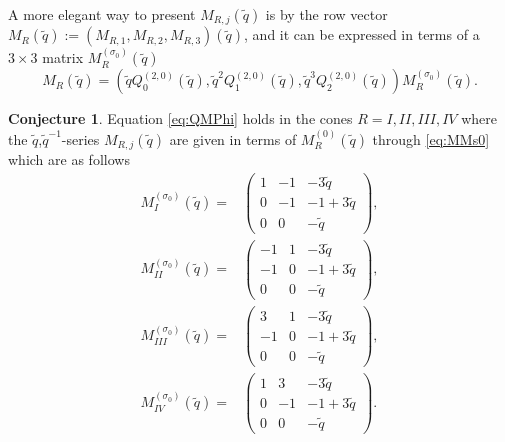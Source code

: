 \documentclass[12pt,reqno]{amsart}
\theoremstyle{definition}
\newtheorem{conjecture}[theorem]{Conjecture}
\def\s{\sigma}
\def\tq{\tilde{q}}
\def\-{\,-\,}
\def\mf{\mathfrak}
\begin{document}
A more elegant way to present $M_{R,j}(\tq)$ is by the row vector
$M_R(\tq) := (M_{R,1},M_{R,2},M_{R,3})(\tq)$, and it can be expressed
in terms of a $3\times 3$ matrix $M^{(\s_0)}_R(\tq)$
\begin{equation}
  M_R(\tq)
  = \left(\tq Q^{(2,0)}_0(\tq),\tq^2Q_1^{(2,0)}(\tq),\tq^3Q_2^{(2,0)}(\tq)\right)
  M^{(\s_0)}_R(\tq).
  \label{eq:MMs052}
\end{equation}
\begin{conjecture}
  Equation \eqref{eq:QMPhi} holds in the cones $R=I,II,III,IV$ where
  the $\tq$,$\tq^{-1}$-series $M_{R,j}(\tq)$ are given in terms of
  $M_R^{(0)}(\tq)$ through \eqref{eq:MMs0} which are as follows
  \begin{subequations}
  \begin{align}
    M^{(\s_0)}_{I}(\tq) =
    &\begin{pmatrix}
       1&-1&-3\tq\\0&-1&-1+3\tq\\0&0&-\tq
     \end{pmatrix},\\
    M^{(\s_0)}_{II}(\tq) =
    &\begin{pmatrix}
       -1&1&-3\tq\\-1&0&-1+3\tq\\0&0&-\tq
     \end{pmatrix},\\
    M^{(\s_0)}_{III}(\tq) =
    &\begin{pmatrix}
        3&1&-3\tq\\-1&0&-1+3\tq\\0&0&-\tq
     \end{pmatrix},\\
    M^{(\s_0)}_{IV}(\tq) =
    &\begin{pmatrix}
     1&3&-3\tq\\0&-1&-1+3\tq\\0&0&-\tq   
     \end{pmatrix}.
  \end{align}
\end{subequations}
\end{conjecture}


\end{document}
